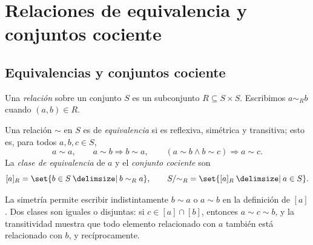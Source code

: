\section{Relaciones de equivalencia y conjuntos cociente}\label{sec:preliminares-equivalencias}

\subsection{Equivalencias y conjuntos cociente}\label{tema:1-1-3}
Una \emph{relación} sobre un conjunto $S$ es un subconjunto $R\subseteq S\times S$. Escribimos $a\sim_R b$ cuando $(a,b)\in R$.
\begin{defi}
Una relación $\sim$ en $S$ es de \emph{equivalencia} si es reflexiva, simétrica y transitiva; esto es, para todos $a,b,c\in S$,
\[
a\sim a,\qquad a\sim b\Rightarrow b\sim a,
\qquad (a\sim b\land b\sim c)\Rightarrow a\sim c.
\]
La \emph{clase de equivalencia} de $a$ y el \emph{conjunto cociente} son
\[
[a]_R=\set{b\in S\given b\sim_R a},\qquad
S/{\sim_R}=\set{[a]_R\given a\in S}.
\]
\end{defi}
La simetría permite escribir indistintamente $b\sim a$ o $a\sim b$ en la definición de $[a]$. Dos clases son iguales o disjuntas: si $c\in[a]\cap[b]$, entonces $a\sim c\sim b$, y la transitividad muestra que todo elemento relacionado con $a$ también está relacionado con $b$, y recíprocamente.
